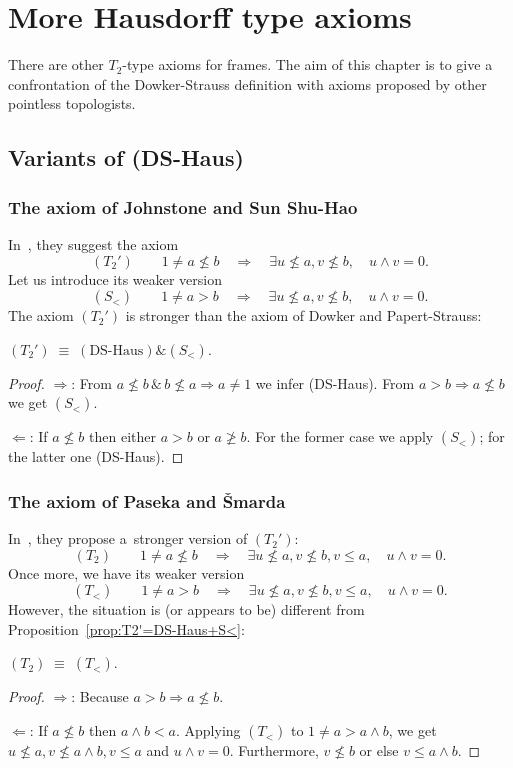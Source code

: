 \chapter{More Hausdorff type axioms}

There are other $T_2$-type axioms for frames.
The aim of this chapter is to give a confrontation of the Dowker-Strauss
definition with axioms proposed by other pointless topologists.

\section{Variants of (DS-Haus)}

\subsection{The axiom of Johnstone and Sun Shu-Hao}

In~\cite{johnstone-shu-hao}, they suggest the axiom
\[
  (T_2') \qquad
  1 \ne a\not\le b \quad \Rightarrow \quad \exists u\not\leq a, v\not\leq b,
  \quad u \wedge v = 0.
\]
Let us introduce its weaker version
\[
  (S_<) \qquad
  1 \ne a > b \quad \Rightarrow \quad \exists u\not\leq a, v\not\leq b,
  \quad u \wedge v = 0.
\]
The axiom $(T_2')$ is stronger than the axiom of Dowker and Papert-Strauss:
\begin{prop} \label{prop:T2'=DS-Haus+S<}
  $(T_2') \; \equiv \; (\text{DS-Haus}) \& (S_<)$.
\end{prop}
\begin{proof}
  $\Rightarrow$:
  From $a\not\le b \, \& \,  b\not\le a \Rightarrow a \ne 1$ we infer
  (DS-Haus).
  From $a > b \Rightarrow a \not\le b$ we get $(S_<)$.

  $\Leftarrow$:
  If $a \not\le b$ then either $a > b$ or $a\not\ge b$.
  For the former case we apply $(S_<)$; for the latter one (DS-Haus).
\end{proof}

\subsection{The axiom of Paseka and Šmarda}
In~\cite{paseka-smarda92}, they propose a~stronger version of $(T_2')$:
\[
  (T_2) \qquad
  1 \ne a\not\le b \quad \Rightarrow \quad \exists u\not\leq a, v\not\leq b,
  \boxed{v \le a}, \quad u \wedge v = 0.
\]
Once more, we have its weaker version
\[
  (T_<) \qquad
  1 \ne a > b \quad \Rightarrow \quad \exists u\not\leq a, v\not\leq b, v \le
  a, \quad u \wedge v = 0.
\]
However, the situation is (or appears to be) different from
Proposition~\ref{prop:T2'=DS-Haus+S<}:
\begin{prop}
  $(T_2) \; \equiv \; (T_<)$.
\end{prop}
\begin{proof}
  $\Rightarrow$:
  Because $a > b \Rightarrow a \not\le b$.

  $\Leftarrow$:
  If $a\not\le b$ then $a \wedge b < a$.
  Applying $(T_<)$ to $1 \ne a > a \wedge b$, we get $u\not\le a, v\not\le a
  \wedge b, v\le a$ and $u \wedge v = 0$.
  Furthermore, $v\not\le b$ or else $v\le a \wedge b$.
\end{proof}

